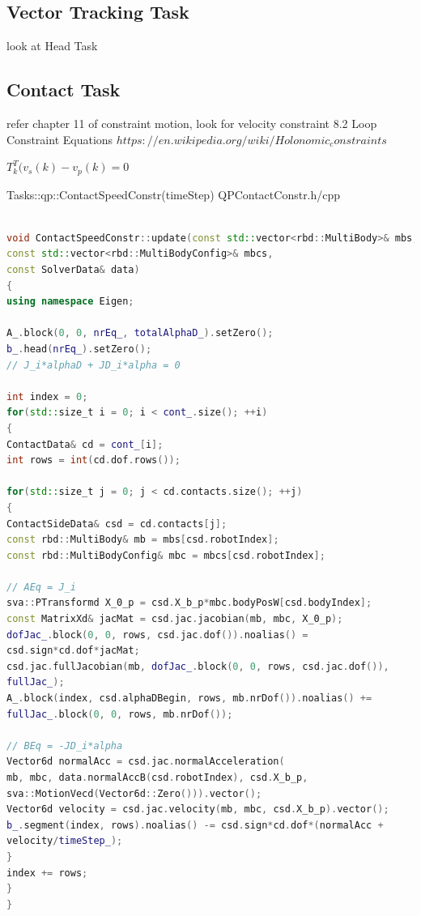 \documentclass[a4paper, 12pt, oneside]{Thesis}  %
\begin{document}
\subsection{Vector Tracking Task}\label{HeadTask}
look at Head Task

\subsection{Contact Task}\label{contact}

refer chapter 11 of \cite{featherstone2014rigid}
constraint motion, look for velocity constraint
8.2 Loop Constraint Equations
$https://en.wikipedia.org/wiki/Holonomic_constraints$

$T^{T}_{k}(v_s(k)-v_p(k)=0$

Tasks::qp::ContactSpeedConstr(timeStep)
QPContactConstr.h/cpp

\begin{lstlisting}[language=C++,basicstyle=\footnotesize, caption={QPContactConstr}]

void ContactSpeedConstr::update(const std::vector<rbd::MultiBody>& mbs,
const std::vector<rbd::MultiBodyConfig>& mbcs,
const SolverData& data)
{
using namespace Eigen;

A_.block(0, 0, nrEq_, totalAlphaD_).setZero();
b_.head(nrEq_).setZero();
// J_i*alphaD + JD_i*alpha = 0

int index = 0;
for(std::size_t i = 0; i < cont_.size(); ++i)
{
ContactData& cd = cont_[i];
int rows = int(cd.dof.rows());

for(std::size_t j = 0; j < cd.contacts.size(); ++j)
{
ContactSideData& csd = cd.contacts[j];
const rbd::MultiBody& mb = mbs[csd.robotIndex];
const rbd::MultiBodyConfig& mbc = mbcs[csd.robotIndex];

// AEq = J_i
sva::PTransformd X_0_p = csd.X_b_p*mbc.bodyPosW[csd.bodyIndex];
const MatrixXd& jacMat = csd.jac.jacobian(mb, mbc, X_0_p);
dofJac_.block(0, 0, rows, csd.jac.dof()).noalias() =
csd.sign*cd.dof*jacMat;
csd.jac.fullJacobian(mb, dofJac_.block(0, 0, rows, csd.jac.dof()),
fullJac_);
A_.block(index, csd.alphaDBegin, rows, mb.nrDof()).noalias() +=
fullJac_.block(0, 0, rows, mb.nrDof());

// BEq = -JD_i*alpha
Vector6d normalAcc = csd.jac.normalAcceleration(
mb, mbc, data.normalAccB(csd.robotIndex), csd.X_b_p,
sva::MotionVecd(Vector6d::Zero())).vector();
Vector6d velocity = csd.jac.velocity(mb, mbc, csd.X_b_p).vector();
b_.segment(index, rows).noalias() -= csd.sign*cd.dof*(normalAcc +
velocity/timeStep_);
}
index += rows;
}
}
\end{lstlisting}
\end{document}
